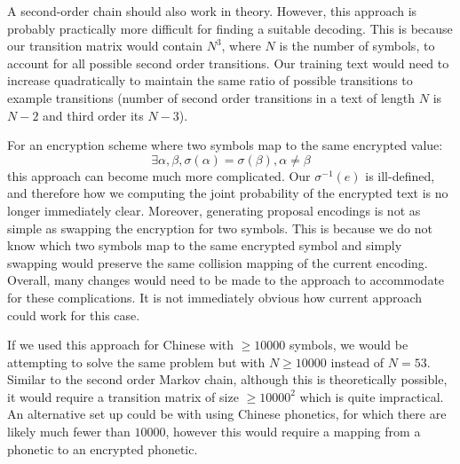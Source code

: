 \documentclass[12pt]{article}
\begin{document}
\begin{enumerate}
A second-order chain should also work in theory. However, this approach is probably practically  more difficult for finding a suitable decoding. This is because our transition matrix would contain $N^3$, where $N$ is the number of symbols, to account for all possible second order transitions. Our training text would need to increase quadratically to maintain the same ratio of possible transitions to example transitions (number of second order transitions in a text of length $N$ is $N-2$ and third order its $N-3$).

For an encryption scheme where two symbols map to the same encrypted value:
$$\exists \alpha, \beta, \sigma(\alpha) = \sigma(\beta), \alpha \neq \beta$$
this approach can become much more complicated. Our $\sigma^{-1}(e)$ is ill-defined, and therefore how we computing the joint probability of the encrypted text is no longer immediately clear. Moreover, generating proposal encodings is not as simple as swapping the encryption for two symbols. This is because we do not know which two symbols map to the same encrypted symbol and simply swapping would preserve the same collision mapping of the current encoding. Overall, many changes would need to be made to the approach to accommodate for these complications. It is not immediately obvious how current approach could work for this case.

If we used this approach for Chinese with $\geq 10000$ symbols, we would be attempting to solve the same problem but with $N\geq10000$ instead of $N=53$. Similar to the second order Markov chain, although this is theoretically possible, it would require a transition matrix of size $\geq10000^2$ which is quite impractical. An alternative set up  could be with using Chinese phonetics, for which there are likely much fewer than $10000$, however this would require a mapping from a phonetic to an encrypted phonetic.

\end{enumerate}
\newpage
\end{document}
